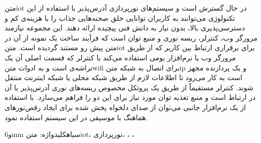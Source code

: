 ‌متن{iot} در حال گسترش است و سیستم‌های نورپردازی آدرس‌پذیر با استفاده از این تکنولوژی می‌توانند به کاربران توانایی خلق صحنه‌هایی جذاب را با هزینه‌ی کم و دسترسی‌پذیری بالا، بدون نیاز به دانش فنی پیچیده ارائه دهند. این مجموعه‌ نیازمند مرورگر وب، کنترلر، ریسه نوری و منبع توان است که فرآیند ساخت یک نمونه از آن در متن پیش رو مستند گردیده است. ‌متن{iot} برای برقراری ارتباط بین کاربر که از طریق مرورگر وب یا نرم‌افزار بومی استفاده می‌کند با کنترلر که قسمت اصلی آن یک تراشه‌ی  است و به ادوات ‌متن{wifi} برای اتصال به شبکه ‌متن{ip} و یک پردازنده مجهز است به کار می‌رود تا اطلاعات لازم از طریق شبکه محلی یا شبکه اینترنت منتقل شوند. کنترلر مستقیماً از طریق یک پروتکل مخصوص ریسه‌های نوری آدرس‌پذیر با آن در ارتباط است و منبع تغذیه توان مورد نیاز برای این دو را فراهم می‌سازد. با استفاده از یک نرم‌افزار جانبی می‌توان از  صدای دلخواه پخش شده برای ایجاد رقص‌نورهای هماهنگ با موسیقی در این سیستم استفاده نمود.

‌و{6mm}
‌سیاه{کلیدواژه}:
‌متن{iot}،
نورپردازی،
،
،

